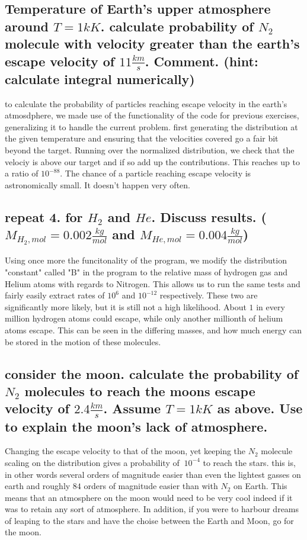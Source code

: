 \documentclass[a4paper,11pt]{article}
\begin{document}
\subsection{ Temperature of Earth's upper atmosphere around $T=1kK$. calculate probability of $N_2$ molecule with velocity 
            greater than the earth's escape velocity of $11\frac{km}{s}$. Comment. (hint: calculate integral numerically) }%

to calculate the probability of particles reaching escape velocity in the earth's atmosdphere, we made use of the functionality of the code for
previous exercises, generalizing it to handle the current problem. first generating the distribution at the given temperature and ensuring that the 
velocities covered go a fair bit beyond the target. Running over the normalized distribution, we check that the velociy is above our target and if so 
add up the contributions. This reaches up to a ratio of $10^{-88}$. The chance of a particle reaching escape velocity is astronomically small. It doesn't 
happen very often. 



\subsection{ repeat 4. for $H_2$ and $He$. Discuss results. ($M_{H_2, mol} = 0.002\frac{kg}{mol}$ and 
            $M_{He, mol} = 0.004\frac{kg}{mol}$)  }%
Using once more the funcitonality of the program, we modify the distribution "constant" called "B" in the program to the relative mass of hydrogen gas and
Helium atoms with regards to Nitrogen. This allows us to run the same tests and fairly easily extract rates of $10^{6}$ and $10^{-12}$ respectively. These
two are significantly more likely, but it is still not a high likelihood. About $1$ in every million hydrogen atoms could escape, while only another millionth
of helium atoms escape. This can be seen in the differing masses, and how much energy can be stored in the motion of these molecules. 

\subsection{ consider the moon. calculate the probability of $N_2$ molecules to reach the moons escape velocity of
            $2.4\frac{km}{s}$. Assume $T=1kK$ as above. Use to explain the moon's lack of atmosphere. }%
Changing the escape velocity to that of the moon, yet keeping the $N_2$ molecule scaling on the distribution gives a probability of $~10^{-4}$
to reach the stars. this is, in other words several orders of magnitude easier than even the lightest gasses on earth and roughly $84$ orders of 
magnitude easier than with $N_2$ on Earth. This means that an atmosphere on the moon would need to be very cool indeed if it was to retain any sort
of atmosphere. In addition, if you were to harbour dreams of leaping to the stars and have the choise between the Earth and Moon, go for the moon. 




\end{document}
